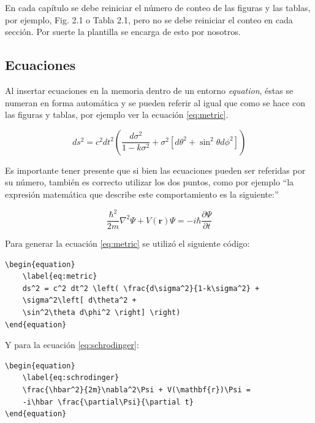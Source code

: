 En cada capítulo se debe reiniciar el número de conteo de las figuras y las tablas, por ejemplo, Fig. 2.1 o Tabla 2.1, pero no se debe reiniciar el conteo en cada sección. Por suerte la plantilla se encarga de esto por nosotros.

\subsection{Ecuaciones}
\label{sec:Ecuaciones}

Al insertar ecuaciones en la memoria dentro de un entorno \textit{equation}, éstas se numeran en forma automática  y se pueden referir al igual que como se hace con las figuras y tablas, por ejemplo ver la ecuación \ref{eq:metric}.

\begin{equation}
	\label{eq:metric}
	ds^2 = c^2 dt^2 \left( \frac{d\sigma^2}{1-k\sigma^2} + \sigma^2\left[ d\theta^2 + \sin^2\theta d\phi^2 \right] \right)
\end{equation}
                                                        
Es importante tener presente que si bien las ecuaciones pueden ser referidas por su número, también es correcto utilizar los dos puntos, como por ejemplo ``la expresión matemática que describe este comportamiento es la siguiente:''

\begin{equation}
	\label{eq:schrodinger}
	\frac{\hbar^2}{2m}\nabla^2\Psi + V(\mathbf{r})\Psi = -i\hbar \frac{\partial\Psi}{\partial t}
\end{equation}

Para generar la ecuación \ref{eq:metric} se utilizó el siguiente código:

\begin{verbatim}
\begin{equation}
	\label{eq:metric}
	ds^2 = c^2 dt^2 \left( \frac{d\sigma^2}{1-k\sigma^2} + 
	\sigma^2\left[ d\theta^2 + 
	\sin^2\theta d\phi^2 \right] \right)
\end{equation}
\end{verbatim}

Y para la ecuación \ref{eq:schrodinger}:

\begin{verbatim}
\begin{equation}
	\label{eq:schrodinger}
	\frac{\hbar^2}{2m}\nabla^2\Psi + V(\mathbf{r})\Psi = 
	-i\hbar \frac{\partial\Psi}{\partial t}
\end{equation}

\end{verbatim}

